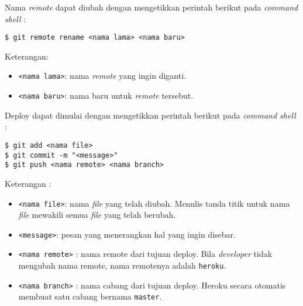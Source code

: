 Nama \textit{remote} dapat diubah dengan mengetikkan perintah berikut pada \textit{command shell} :
\begin{lstlisting}
$ git remote rename <nama lama> <nama baru>
\end{lstlisting}
Keterangan:
\begin{itemize}
\item \texttt{<nama lama>}: nama \textit{remote} yang ingin diganti.
\item \texttt{<nama baru>}: nama baru untuk \textit{remote} tersebut.
\end{itemize}

Deploy dapat dimulai dengan mengetikkan perintah berikut pada \textit{command shell} :
\begin{lstlisting}
$ git add <nama file>
$ git commit -m "<message>"
$ git push <nama remote> <nama branch>
\end{lstlisting}
Keterangan :
\begin{itemize}
\item \texttt{<nama file>}: nama \textit{file} yang telah diubah. Menulis tanda titik untuk nama \textit{file} mewakili semua \textit{file} yang telah berubah.
\item \texttt{<message>}: pesan yang menerangkan hal yang ingin disebar.
\item \texttt{<nama remote>} : nama remote dari tujuan deploy. Bila \textit{developer} tidak mengubah nama remote, nama remotenya adalah \texttt{heroku}. 
\item \texttt{<nama branch>} : nama cabang dari tujuan deploy. Heroku secara otomatis membuat satu cabang bernama \texttt{master}.
\end{itemize}

